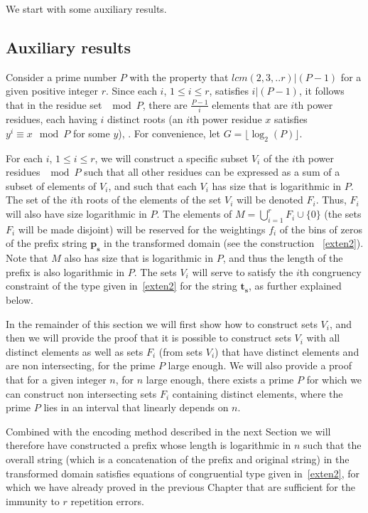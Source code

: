 \documentclass[12pt]{article} \pagestyle{plain} \topmargin
\begin{document}
We start with some auxiliary results.

\subsection{Auxiliary results}\label{aux2} Consider a prime number
$P$ with the property that $lcm(2,3,..r) | (P-1)$ for a given
positive integer $r$. Since each $i$, $1 \leq i \leq r$, satisfies
$i|(P-1)$, it follows that in the residue set $\mod P$, there are
$\frac{P-1}{i}$ elements that are $i$th power residues, each having
$i$ distinct roots (an $i$th power residue $x$ satisfies $y^i \equiv
x \mod P$ for some $y$), \cite{apostol}. For convenience, let $G =
\lfloor \log_2(P) \rfloor$.

For each $i$, $1 \leq i \leq r$, we will construct a specific subset
$V_i$ of the $i$th power residues $\mod P$ such that all other
residues can be expressed as a sum of a subset  of elements of
$V_i$, and such that each $V_i$ has size that is logarithmic in $P$.
The set of the $i$th roots of the elements of the set $V_i$ will be
denoted $F_i$. Thus, $F_i$ will also have size logarithmic in $P$.
The elements of $M =\bigcup_{i=1}^r F_i \cup \{0\}$ (the sets $F_i$
will be made disjoint) will be reserved for the weightings $f_i$ of
the bins of zeros of the prefix string $\mathbf{p_s}$ in the
transformed domain (see the construction ~\eqref{exten2}). Note that
$M$ also has size that is logarithmic in $P$, and thus the length of
the prefix is also logarithmic in $P$. The sets $V_i$ will serve to
satisfy the $i$th congruency constraint of the type given
in~\eqref{exten2} for the string $\mathbf{t_s}$, as further
explained below.

In the remainder of this section we will first show how to construct
sets $V_i$, and then we will provide the proof that it is possible
to construct sets $V_i$ with all distinct elements as well as  sets
$F_i$ (from sets $V_i$) that have distinct elements and are non
intersecting, for the prime $P$ large enough. We will also provide a
proof that for a given integer $n$, for $n$ large enough, there
exists a prime $P$ for which we can construct non intersecting sets
$F_i$ containing distinct elements, where the prime $P$ lies in an
interval that linearly depends on $n$.

Combined with the encoding method described in the next Section we
will therefore have constructed a prefix whose length is logarithmic
in $n$ such that the overall string (which is a concatenation of the
prefix and original string) in the transformed domain satisfies
equations of congruential type given in~\eqref{exten2}, for which we
have already proved in the previous Chapter that are sufficient for
the immunity to $r$ repetition errors.
\end{document}

